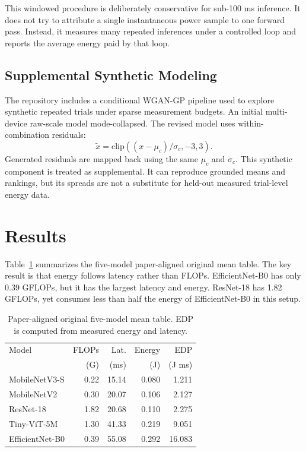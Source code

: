 \documentclass[conference]{IEEEtran}
\begin{document}
This windowed procedure is deliberately conservative for sub-100 ms inference.
It does not try to attribute a single instantaneous power sample to one
forward pass. Instead, it measures many repeated inferences under a controlled
loop and reports the average energy paid by that loop.

\subsection{Supplemental Synthetic Modeling}

The repository includes a conditional WGAN-GP pipeline used to explore
synthetic repeated trials under sparse measurement budgets. An initial
multi-device raw-scale model mode-collapsed. The revised model uses
within-combination residuals:
\begin{equation}
    \tilde{x} = \mathrm{clip}\left((x-\mu_c)/\sigma_c,-3,3\right).
\end{equation}
Generated residuals are mapped back using the same $\mu_c$ and $\sigma_c$.
This synthetic component is treated as supplemental. It can reproduce
grounded means and rankings, but its spreads are not a substitute for
held-out measured trial-level energy data.

\section{Results}

Table~\ref{tab:original} summarizes the five-model paper-aligned original mean
table. The key result is that energy follows latency rather than FLOPs.
EfficientNet-B0 has only 0.39 GFLOPs, but it has the largest latency and
energy. ResNet-18 has 1.82 GFLOPs, yet consumes less than half the energy of
EfficientNet-B0 in this setup.

\begin{table}[t]
\centering
\caption{Paper-aligned original five-model mean table. EDP is computed from
measured energy and latency.}
\label{tab:original}
\begin{tabular}{lrrrr}
\toprule
Model & FLOPs & Lat. & Energy & EDP \\
 & (G) & (ms) & (J) & (J ms) \\
\midrule
MobileNetV3-S & 0.22 & 15.14 & 0.080 & 1.211 \\
MobileNetV2 & 0.30 & 20.07 & 0.106 & 2.127 \\
ResNet-18 & 1.82 & 20.68 & 0.110 & 2.275 \\
Tiny-ViT-5M & 1.30 & 41.33 & 0.219 & 9.051 \\
EfficientNet-B0 & 0.39 & 55.08 & 0.292 & 16.083 \\
\bottomrule
\end{tabular}
\end{table}
\end{document}
